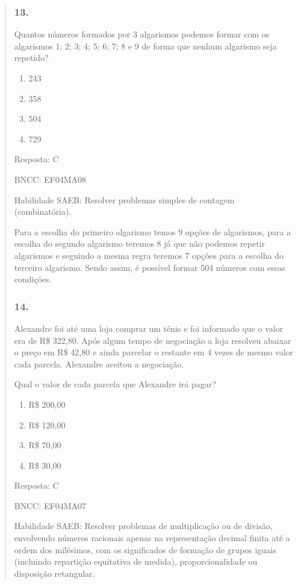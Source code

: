 \begin{enumerate}
\begin{escolha}
\begin{enumerate}
\begin{itemize}
\begin{itemize}
\begin{escolha}
\begin{quote}
\begin{escolha}
{\subsubsection{13.}\label{section-199}

Quantos números formados por 3 algarismos podemos formar com os
algarismos 1; 2; 3; 4; 5; 6; 7; 8 e 9 de forma que nenhum algarismo seja
repetido?

\begin{enumerate}
\def\labelenumi{\alph{enumi})}
\item
  243
\item
  358
\item
  504
\item
  729
\end{enumerate}

Resposta: C

BNCC: EF04MA08

Habilidade SAEB: Resolver problemas simples de contagem (combinatória).

Para a escolha do primeiro algarismo temos 9 opções de algarismos, para
a escolha do segundo algarismo teremos 8 já que não podemos repetir
algarismos e seguindo a mesma regra teremos 7 opções para a escolha do
terceiro algarismo. Sendo assim, é possível formar 504 números com essas
condições.

\subsubsection{14.}\label{section-200}

Alexandre foi até uma loja comprar um tênis e foi informado que o valor
era de R\$ 322,80. Após algum tempo de negociação a loja resolveu
abaixar o preço em R\$ 42,80 e ainda parcelar o restante em 4 vezes de
mesmo valor cada parcela. Alexandre aceitou a negociação.

Qual o valor de cada parcela que Alexandre irá pagar?

\begin{enumerate}
\def\labelenumi{\alph{enumi})}
\item
  R\$ 200,00
\item
  R\$ 120,00
\item
  R\$ 70,00
\item
  R\$ 30,00
\end{enumerate}

Resposta: C

BNCC: EF04MA07

Habilidade SAEB: Resolver problemas de multiplicação ou de divisão,
envolvendo números racionais apenas na representação decimal finita até
a ordem dos milésimos, com os significados de formação de grupos iguais
(incluindo repartição equitativa de medida), proporcionalidade ou
disposição retangular.

}
\end{escolha}
\end{quote}
\end{escolha}
\end{itemize}
\end{itemize}
\end{enumerate}
\end{escolha}
\end{enumerate}
